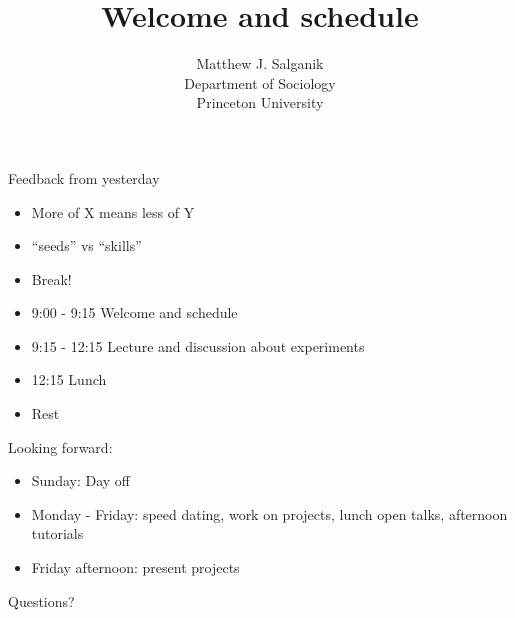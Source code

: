 \documentclass[aspectratio=169]{beamer}
\title[]{Welcome and schedule}
\author[]{Matthew J. Salganik\\Department of Sociology\\Princeton University}
\date[]{Summer Institute in Computational Social Science\\June 24, 2017
\vfill
\begin{flushright}
\vspace{0.6in}
\texttt{[image: figures/cc-by.png]}
\end{flushright}
}
\begin{document}
\frame{\titlepage}
\begin{frame}

Feedback from yesterday
\begin{itemize}
\item More of X means less of Y
\pause
\item ``seeds'' vs ``skills''
\pause
\item Break!
\end{itemize}

\end{frame}
\begin{frame}

\begin{itemize}
\item 9:00 - 9:15 Welcome and schedule
\item 9:15 - 12:15 Lecture and discussion about experiments
\item 12:15 Lunch
\item Rest
\end{itemize}

\end{frame}
\begin{frame}

Looking forward:
\begin{itemize}
\item Sunday: Day off
\item Monday - Friday: speed dating, work on projects, lunch open talks, afternoon tutorials
\item Friday afternoon: present projects
\end{itemize}

\end{frame}
\begin{frame}

Questions?

\end{frame}
\end{document}
